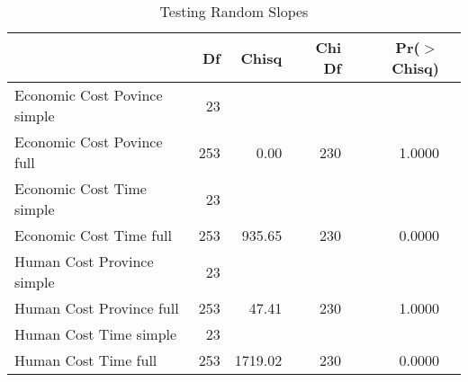 \begin{table}[ht]
	   \caption{Testing Random Slopes} 
	\label{anova}
\centering
\begin{tabular}{lrrrrr}
  \hline
 & Df & Chisq & Chi Df & Pr($>$Chisq) \\ 
  \hline
Economic Cost Povince simple & 23&  &  &  \\ 
Economic Cost Povince full & 253 & 0.00 & 230 & 1.0000 \\ 
Economic Cost Time simple & 23 &  &  &  \\ 
Economic Cost Time full & 253 & 935.65 & 230 & 0.0000 \\ 
Human Cost Province simple & 23 &  &  &  \\ 
Human Cost Province full & 253 & 47.41 & 230 & 1.0000 \\ 
Human Cost Time simple & 23 &  &  &  \\ 
Human Cost Time full & 253 & 1719.02 & 230 & 0.0000 \\ 
   \hline

\end{tabular}
\end{table}
